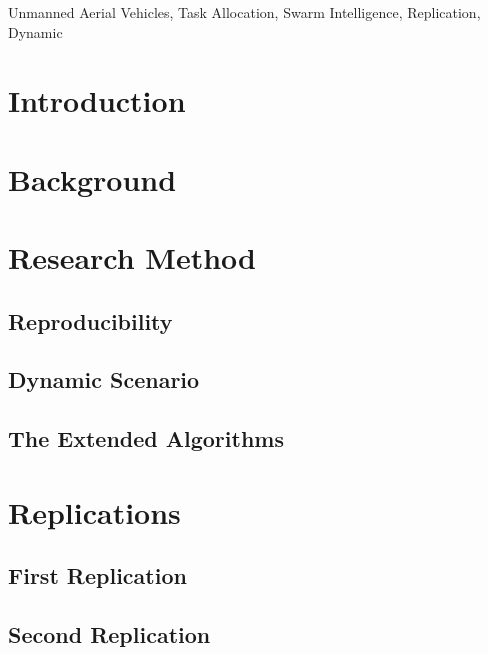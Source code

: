 \documentclass[review]{elsarticle}
\begin{document}
\begin{frontmatter}
\begin{keyword}
Unmanned Aerial Vehicles, Task Allocation, Swarm Intelligence, Replication, Dynamic
\end{keyword}

\end{frontmatter}


\section{Introduction} \label{sec:introduction}


\section{Background}\label{sec:background}


\section{Research Method}\label{sec:method}


\subsection{Reproducibility}\label{sec:reproducibility}


\subsection{Dynamic Scenario}\label{sec:dynamic_scenario}


\subsection{The Extended Algorithms}\label{sec:changes}


\section{Replications}\label{sec:replications}


\subsection{First Replication}\label{sec:original}


\subsection{Second Replication}\label{sec:replication}

\end{document}
